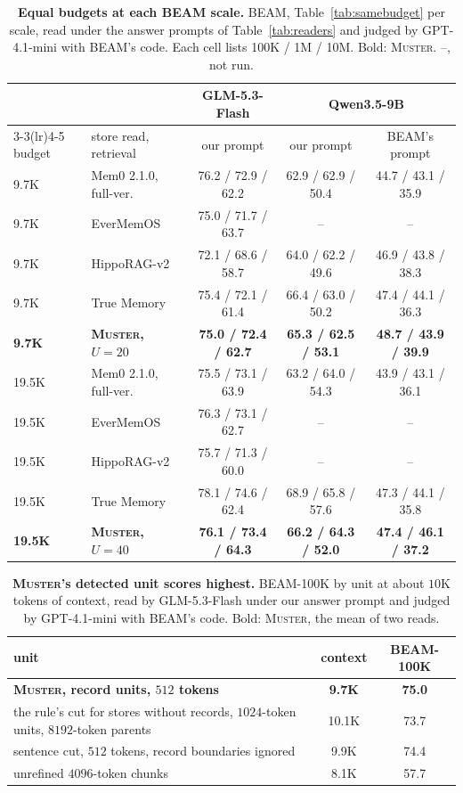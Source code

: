 \documentclass{article}
\newcommand{\ours}{\rowcolor{oursbg}}
\newcommand{\tabfont}{\fontsize{7.5}{8.5}\selectfont\renewcommand{\arraystretch}{1.0}}
\newcommand{\sys}{\textsc{Muster}}
\begin{document}
\begin{table}[H]
\centering\tabfont
\caption{\textbf{Equal budgets at each BEAM scale.} BEAM, Table~\ref{tab:samebudget} per scale, read under the answer prompts of Table~\ref{tab:readers} and judged by GPT-4.1-mini with BEAM's code. Each cell lists 100K / 1M / 10M. Bold: \sys{}. --, not run.}
\label{tab:samebudgetscale}
\setlength{\tabcolsep}{3pt}
\begin{tabular}{llccc}
\toprule
 & & GLM-5.3-Flash & \multicolumn{2}{c}{Qwen3.5-9B} \\
\cmidrule(lr){3-3}\cmidrule(lr){4-5}
budget & store read, retrieval & our prompt & our prompt & BEAM's prompt \\
\midrule
9.7K & Mem0 2.1.0, full-ver. & 76.2 / 72.9 / 62.2 & 62.9 / 62.9 / 50.4 & 44.7 / 43.1 / 35.9 \\
9.7K & EverMemOS & 75.0 / 71.7 / 63.7 & -- & -- \\
9.7K & HippoRAG-v2 & 72.1 / 68.6 / 58.7 & 64.0 / 62.2 / 49.6 & 46.9 / 43.8 / 38.3 \\
9.7K & True Memory & 75.4 / 72.1 / 61.4 & 66.4 / 63.0 / 50.2 & 47.4 / 44.1 / 36.3 \\
\ours \textbf{9.7K} & \textbf{\sys{}, $U{=}20$} & \textbf{75.0 / 72.4 / 62.7} & \textbf{65.3 / 62.5 / 53.1} & \textbf{48.7 / 43.9 / 39.9} \\
19.5K & Mem0 2.1.0, full-ver. & 75.5 / 73.1 / 63.9 & 63.2 / 64.0 / 54.3 & 43.9 / 43.1 / 36.1 \\
19.5K & EverMemOS & 76.3 / 73.1 / 62.7 & -- & -- \\
19.5K & HippoRAG-v2 & 75.7 / 71.3 / 60.0 & -- & -- \\
19.5K & True Memory & 78.1 / 74.6 / 62.4 & 68.9 / 65.8 / 57.6 & 47.3 / 44.1 / 35.8 \\
\ours \textbf{19.5K} & \textbf{\sys{}, $U{=}40$} & \textbf{76.1 / 73.4 / 64.3} & \textbf{66.2 / 64.3 / 52.0} & \textbf{47.4 / 46.1 / 37.2} \\
\bottomrule
\end{tabular}
\end{table}

\begin{table}[H]
\centering\tabfont
\caption{\textbf{\sys{}'s detected unit scores highest.} BEAM-100K \cite{beam} by unit at about $10$K tokens of context, read by GLM-5.3-Flash under our answer prompt and judged by GPT-4.1-mini with BEAM's code. Bold: \sys{}, the mean of two reads.}
\label{tab:beamabl}
\begin{tabular}{lcc}
\toprule
unit & context & BEAM-100K \\
\midrule
\ours \textbf{\sys{}, record units, $512$ tokens} & \textbf{9.7K} & \textbf{75.0} \\
the rule's cut for stores without records, $1024$-token units, $8192$-token parents & 10.1K & 73.7 \\
sentence cut, $512$ tokens, record boundaries ignored & 9.9K & 74.4 \\
unrefined $4096$-token chunks & 8.1K & 57.7 \\
\bottomrule
\end{tabular}
\end{table}
\end{document}
